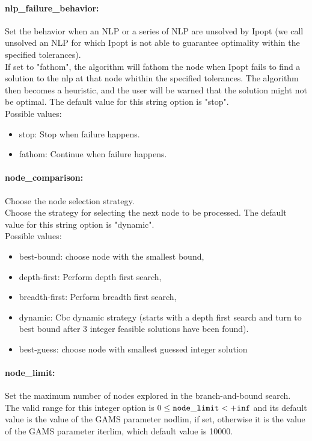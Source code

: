 \paragraph{nlp\_failure\_behavior:} Set the behavior when an NLP or a series of NLP are unsolved by Ipopt (we call unsolved an NLP for which Ipopt is not able to guarantee optimality within the specified tolerances). $\;$ \\
 If set to "fathom", the algorithm will fathom the
node when Ipopt fails to find a solution to the
nlp at that node whithin the specified
tolerances. The algorithm then becomes a
heuristic, and the user will be warned that the
solution might not be optimal.
The default value for this string option is "stop".
\\ 
Possible values:
\begin{itemize}
   \item stop: Stop when failure happens.
   \item fathom: Continue when failure happens.
\end{itemize}

\paragraph{node\_comparison:} Choose the node selection strategy. $\;$ \\
 Choose the strategy for selecting the next node
to be processed.
The default value for this string option is "dynamic".
\\ 
Possible values:
\begin{itemize}
   \item best-bound: choose node with the smallest bound,
   \item depth-first: Perform depth first search,
   \item breadth-first: Perform breadth first search,
   \item dynamic: Cbc dynamic strategy (starts with a depth first
search and turn to best bound after 3 integer
feasible solutions have been found).
   \item best-guess: choose node with smallest guessed integer
solution
\end{itemize}

\paragraph{node\_limit:} Set the maximum number of nodes explored in the branch-and-bound search. $\;$ \\
 The valid range for this integer option is
$0 \le {\tt node\_limit } <  {\tt +inf}$
and its default value is the value of the GAMS parameter nodlim, if set, otherwise it is the value of the GAMS parameter iterlim, which default value is 10000.


